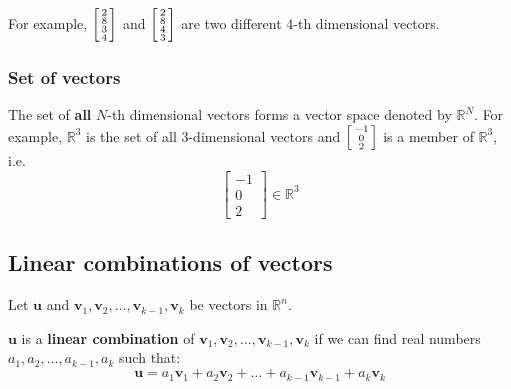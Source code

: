 \documentclass[11pt]{article}
\begin{document}
For example,
\begin{math}
\begin{bsmallmatrix}
2 \\
8 \\
3 \\
4
\end{bsmallmatrix}
\end{math}
and
\begin{math}
\begin{bsmallmatrix}
2 \\
8 \\
4 \\
3
\end{bsmallmatrix}
\end{math}
are two different 4-th dimensional vectors.
\subsubsection{Set of vectors}
\label{sec:org9e68f01}
The set of \textbf{all} \(N\)-th dimensional vectors forms a vector space denoted by \(\mathbb{R}^N\). For example, \(\mathbb{R}^3\) is the set of all 3-dimensional vectors and
\begin{math}
\begin{bsmallmatrix}
-1 \\
0 \\
2
\end{bsmallmatrix}
\end{math}
is a member of \(\mathbb{R}^3\), i.e.
\begin{displaymath}
\begin{bmatrix}
-1 \\
0 \\
2
\end{bmatrix} \in \mathbb{R}^3
\end{displaymath}
\subsection{Linear combinations of vectors}
\label{sec:orgc89b84c}
Let \(\boldsymbol{u}\) and \(\boldsymbol{v}_1, \boldsymbol{v}_2, \ldots, \boldsymbol{v}_{k-1}, \boldsymbol{v}_k\) be vectors in \(\mathbb{R}^n\).


\(\boldsymbol{u}\) is a \textbf{linear combination} of \(\boldsymbol{v}_1, \boldsymbol{v}_2, \ldots, \boldsymbol{v}_{k-1}, \boldsymbol{v}_k\) if we can find real numbers \(a_1, a_2, \ldots, a_{k-1}, a_k\) such that:
\[\boldsymbol{u} = a_1 \boldsymbol{v}_1 + a_2  \boldsymbol{v}_2 + \ldots + a_{k-1} \boldsymbol{v}_{k-1} + a_k \boldsymbol{v}_k\]
\end{document}
